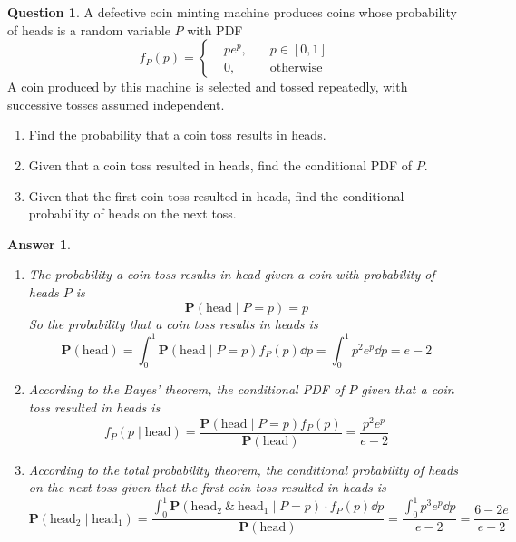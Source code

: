\documentclass[utf8]{article}
\theoremstyle{definition}%
\newtheorem{question}{Question} %
\theoremstyle{plain}%
\newtheorem{answer}{Answer} %
\begin{document}
\begin{question}
    A defective coin minting machine produces coins whose probability of heads is a random variable $P$ with PDF
    \begin{equation}
        f_{P}(p) = \left\{\begin{aligned}
            &p e^p, \quad &p \in [0, 1] \\ 
            &0, \quad &\text{otherwise}
        \end{aligned}\right.
    \end{equation}
    A coin produced by this machine is selected and tossed repeatedly, with successive tosses assumed independent.
    \begin{enumerate}[label=(\alph*)]
        \item Find the probability that a coin toss results in heads.
        \item Given that a coin toss resulted in heads, find the conditional PDF of $P$.
        \item Given that the first coin toss resulted in heads, find the conditional probability of heads on the next toss.
    \end{enumerate}
\end{question} 
\begin{answer} ~
    \begin{enumerate}[label=(\alph*)]
        \item The probability a coin toss results in head given a coin with probability of heads $P$ is
        \begin{equation}
            \mathbf{P}(\text{head} \mid P = p) = p
        \end{equation}
        So the probability that a coin toss results in heads is
        \begin{equation}
            \mathbf{P}(\text{head}) = \int_{0}^{1} \mathbf{P}(\text{head} \mid P = p)f_{P}(p) \dd{p} = \int_{0}^{1} p^2 e^p \dd{p} = e - 2
        \end{equation}
        \item According to the Bayes' theorem, the conditional PDF of $P$ given that a coin toss resulted in heads is
        \begin{equation}
            f_{P}(p \mid \text{head}) = \frac{\mathbf{P}(\text{head} \mid P = p)f_{P}(p)}{\mathbf{P}(\text{head})} = \frac{p^2 e^p}{e - 2}
        \end{equation}
        \item According to the total probability theorem, the conditional probability of heads on the next toss given that the first coin toss resulted in heads is
        \begin{equation}
            \mathbf{P}(\text{head}_2 \mid \text{head}_1) = \frac{\int_0^1 \mathbf{P}(\text{head}_2 ~\&~ \text{head}_1 \mid P = p) \cdot f_{P}(p) \dd{p}}{\mathbf{P}(\text{head})} = \frac{\int_{0}^{1} p^3 e^p \dd{p}}{e - 2} = \frac{6 - 2e}{e - 2}
        \end{equation}
    \end{enumerate}
\end{answer}
\end{document}
